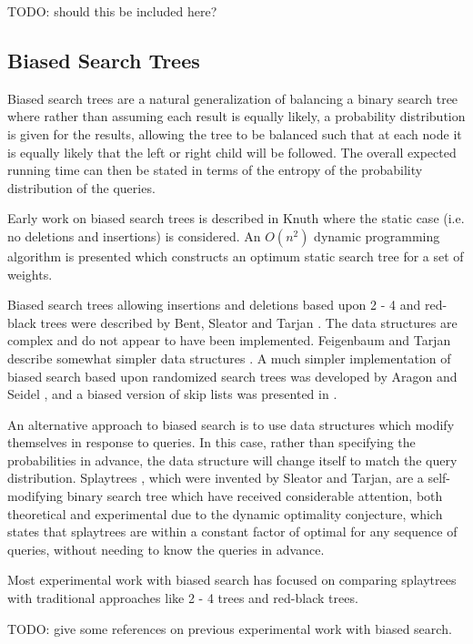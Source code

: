 \documentclass[mcs]{scsthesis}
\begin{document}
TODO: should this be included here?

\subsection{Biased Search Trees}

Biased search trees are a natural generalization of balancing a binary search
tree where rather than assuming each result is equally likely, a probability
distribution is given for the results, allowing the tree to be balanced such
that at each node it is equally likely that the left or right child will be
followed.  The overall expected running time can then be stated in terms of the
entropy of the probability distribution of the queries.

Early work on biased search trees is described in Knuth \cite{knuth} where
the static case (i.e. no deletions and insertions) is considered.  An \(O(n^2)\)
dynamic programming algorithm is presented which constructs an optimum static
search tree for a set of weights.

Biased search trees allowing insertions and deletions based upon 2 - 4 and
red-black trees were described by Bent, Sleator and Tarjan \cite{bst}.  The
data structures are complex and do not appear to have been implemented.
Feigenbaum and Tarjan describe somewhat simpler data structures \cite{bst2}. A
much simpler implementation of biased search based upon randomized search trees
was developed by Aragon and Seidel \cite{treap}, and a biased version of skip
lists \cite{skiplist} was presented in \cite{bsl2}.

An alternative approach to biased search is to use data structures which
modify themselves in response to queries.  In this case, rather than specifying
the probabilities in advance, the data structure will change itself to match
the query distribution.  Splaytrees \cite{splaytree}, which were invented by
Sleator and Tarjan, are a self-modifying binary search tree which have
received considerable attention, both theoretical and experimental due to the
dynamic optimality conjecture, which states that splaytrees are within a
constant factor of optimal for any sequence of queries, without needing to
know the queries in advance.

Most experimental work with biased search has focused on comparing splaytrees
with traditional approaches like 2 - 4 trees and red-black trees.

TODO: give some references on previous experimental work with biased search.
\end{document}
